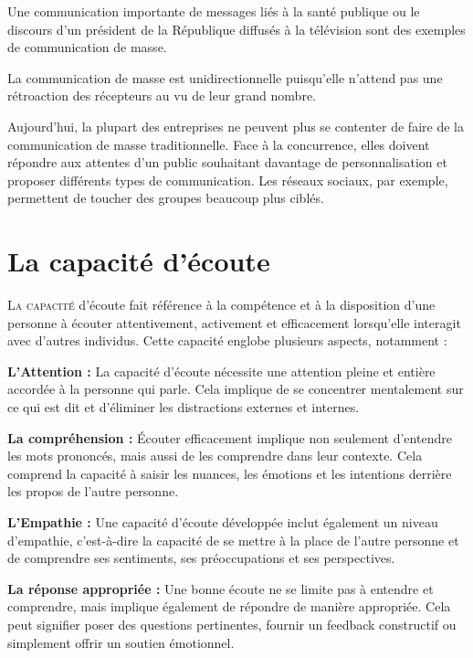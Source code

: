 \documentclass[a4paper, 11pt, oneside]{book}
\begin{document}
Une communication importante de messages liés à la santé publique ou le discours d’un président de la République diffusés à la télévision sont des exemples de communication de masse.

La communication de masse est unidirectionnelle puisqu’elle n’attend pas une rétroaction des récepteurs au vu de leur grand nombre.

Aujourd’hui, la plupart des entreprises ne peuvent plus se contenter de faire de la communication de masse traditionnelle. Face à la concurrence, elles doivent répondre aux attentes d’un public souhaitant davantage de personnalisation et proposer différents types de communication. Les réseaux sociaux, par exemple, permettent de toucher des groupes beaucoup plus ciblés.


\chapter{La capacité d'écoute }\label{ch:2}

\lettrine[lines=2, depth=0, lraise=-0.1, findent=0.3em, nindent=0.3em]{\color{BrickRed}\fontsize{50pt}{72pt}L}{a capacité} d'écoute fait référence à la compétence et à la disposition d'une personne à écouter attentivement, activement et efficacement lorsqu'elle interagit avec d'autres individus. Cette capacité englobe plusieurs aspects, notamment :

\textbf{L'Attention :} La capacité d'écoute nécessite une attention pleine et entière accordée à la personne qui parle. Cela implique de se concentrer mentalement sur ce qui est dit et d'éliminer les distractions externes et internes.

\textbf{La compréhension :} Écouter efficacement implique non seulement d'entendre les mots prononcés, mais aussi de les comprendre dans leur contexte. Cela comprend la capacité à saisir les nuances, les émotions et les intentions derrière les propos de l'autre personne.

\textbf{L'Empathie :} Une capacité d'écoute développée inclut également un niveau d'empathie, c'est-à-dire la capacité de se mettre à la place de l'autre personne et de comprendre ses sentiments, ses préoccupations et ses perspectives.

\textbf{La réponse appropriée :} Une bonne écoute ne se limite pas à entendre et comprendre, mais implique également de répondre de manière appropriée. Cela peut signifier poser des questions pertinentes, fournir un feedback constructif ou simplement offrir un soutien émotionnel.
\end{document}
